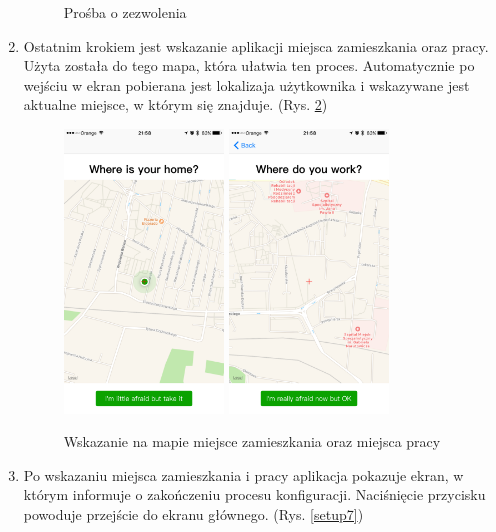\documentclass[a4paper,11pt]{article}
\begin{document}
\begin{enumerate}
\begin{figure}[H]
	\caption {Prośba o zezwolenia}
	\label{setup4}
\end{figure}
\newpage
\item Ostatnim krokiem jest wskazanie aplikacji miejsca zamieszkania oraz pracy. Użyta została do tego mapa, która ułatwia ten proces. Automatycznie po wejściu w ekran pobierana jest lokalizaja użytkownika i wskazywane jest aktualne miejsce, w którym się znajduje. (Rys. \ref{setup5})
\begin{figure}[H]
	\centerline{
	\includegraphics[width=0.4\textwidth]{ios-screens/setup5.png}
	\includegraphics[width=0.4\textwidth]{ios-screens/setup6.png}
	}
	\caption {Wskazanie na mapie miejsce zamieszkania oraz miejsca pracy}
	\label{setup5}
\end{figure}
\newpage
\item Po wskazaniu miejsca zamieszkania i pracy aplikacja pokazuje ekran, w którym informuje o zakończeniu procesu konfiguracji. Naciśnięcie przycisku powoduje przejście do ekranu głównego. (Rys. \ref{setup7})

\end{enumerate}
\end{document}
